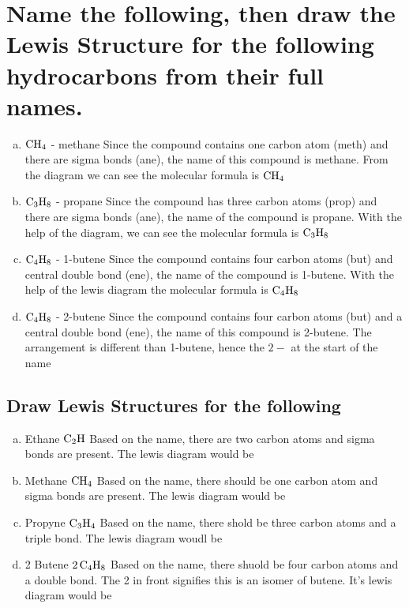 \documentclass{scrartcl}
\begin{document}
\section{Name the following, then draw the Lewis Structure for the following hydrocarbons from their full names.}
\label{sec:orgff5f99e}
\begin{enumerate}[a.]
\item \(\ce{CH4}\) - methane
Since the compound contains one carbon atom (meth) and there are sigma bonds
(ane), the name of this compound is methane. From the diagram we can see the
molecular formula is    \(\ce{CH4}\)
\item \(\ce{C3H8}\) - propane
Since the compound has three carbon atoms (prop) and there are sigma bonds
(ane), the name of the compound is propane. With the help of the diagram, we
can see the molecular formula is    \(\ce{C3H8}\)
\item \(\ce{C4H8}\) - 1-butene
Since the compound contains four carbon atoms (but) and central double bond
(ene), the name of the compound is 1-butene. With the help of the lewis
diagram the molecular formula is \(\ce{C4H8}\)
\item \(\ce{C4H8}\) - 2-butene
Since the compound contains four carbon atoms (but) and a central double bond
(ene), the name of this compound is 2-butene. The arrangement is different
than 1-butene, hence the \(2-\) at the start of the name
\end{enumerate}

\subsection{Draw Lewis Structures for the following}
\label{sec:orga4a12e3}
\begin{enumerate}[a.]
\item Ethane \(\ce{C2H}\)
Based on the name, there are two carbon atoms and sigma bonds are present.
The lewis diagram would be
\item Methane \(\ce{CH4}\)
Based on the name, there should be one carbon atom and sigma bonds are
present. The lewis diagram would be
\item Propyne \(\ce{C3H4}\)
Based on the name, there shold be three carbon atoms and a triple bond. The
lewis diagram woudl be
\item 2 Butene \(\ce{2C4H8}\)
Based on the name, there shuold be four carbon atoms and a double bond. The 2
in front signifies this is an isomer of butene. It's lewis diagram would be
\end{enumerate}
\end{document}
